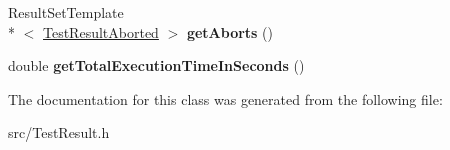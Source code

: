 \begin{DoxyCompactItemize}
\item 
\hypertarget{class_l_test_source_1_1_result_set_mixin_a34ec851ca4a1473c5b3fbc70f927ce04}{Result\-Set\-Template\\*
$<$ \hyperlink{class_l_test_source_1_1_test_result_aborted}{Test\-Result\-Aborted} $>$ {\bfseries get\-Aborts} ()}\label{class_l_test_source_1_1_result_set_mixin_a34ec851ca4a1473c5b3fbc70f927ce04}

\item 
\hypertarget{class_l_test_source_1_1_result_set_mixin_ab1beea1a32db5ba33949d849ef39e666}{double {\bfseries get\-Total\-Execution\-Time\-In\-Seconds} ()}\label{class_l_test_source_1_1_result_set_mixin_ab1beea1a32db5ba33949d849ef39e666}

\end{DoxyCompactItemize}


The documentation for this class was generated from the following file\-:\begin{DoxyCompactItemize}
\item 
src/Test\-Result.\-h\end{DoxyCompactItemize}
